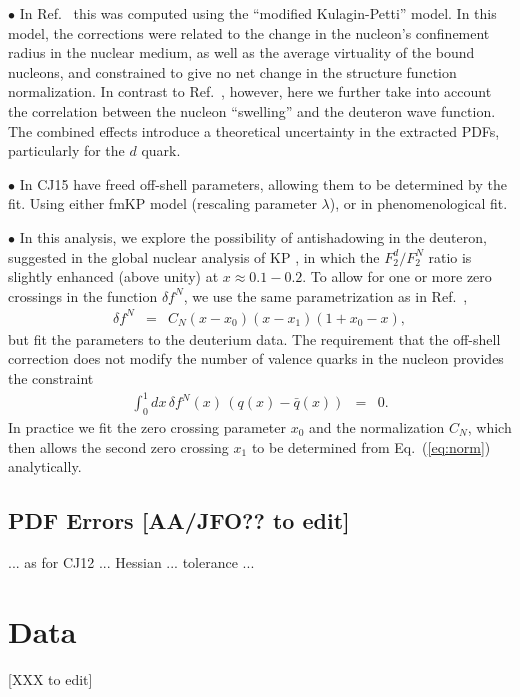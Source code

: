 \documentclass[aps,prd,amsmath,preprint]{revtex4}
\begin{document}
$\bullet$
In Ref.~\cite{CJ11} this was computed using the ``modified Kulagin-Petti''
model.
In this model, the corrections were related to the change in the
nucleon's confinement radius in the nuclear medium, as well as the
average virtuality of the bound nucleons, and constrained to give no
net change in the structure function normalization.  In contrast to
Ref.~\cite{CJ11}, however, here we further take into account the
correlation between the nucleon ``swelling'' and the deuteron wave
function.  The combined effects introduce a theoretical uncertainty
in the extracted PDFs, particularly for the $d$ quark. 


$\bullet$
In CJ15 have freed off-shell parameters, allowing them to be determined
by the fit. Using either fmKP model (rescaling parameter $\lambda$),
or in phenomenological fit.


$\bullet$
In this analysis, we explore the possibility of antishadowing in the
deuteron, suggested in the global nuclear analysis of KP \cite{KP06},
in which the $F_2^d/F_2^N$ ratio is slightly enhanced (above unity)
at $x \approx 0.1-0.2$.
To allow for one or more zero crossings in the function $\delta f^N$,
we use the same parametrization as in Ref.~\cite{KP06},
%
\begin{eqnarray}
\delta f^N
&=& C_N (x-x_0) (x-x_1) (1+x_0-x),
\label{eq:delffit}
\end{eqnarray}
%
but fit the parameters to the deuterium data.
The requirement that the off-shell correction does not modify the
number of valence quarks in the nucleon provides the constraint
%
\begin{eqnarray}
\int_0^1 dx\, \delta f^N(x)\, (q(x)-\bar q(x)) &=& 0.
\label{eq:norm}
\end{eqnarray}
%
In practice we fit the zero crossing parameter $x_0$ and the
normalization $C_N$, which then allows the second zero crossing
$x_1$ to be determined from Eq.~(\ref{eq:norm}) analytically.


\subsection{PDF Errors {\color{red} [AA/JFO?? to edit]}}
\label{ssec:errors}

... as for CJ12 ... Hessian ... tolerance ...



\section{Data} {\color{red} [XXX to edit]}
\label{sec:data}
\end{document}
